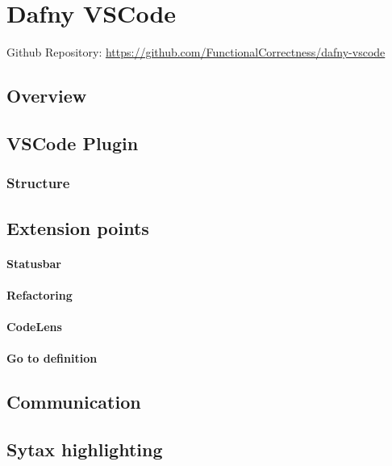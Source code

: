 \section{Dafny VSCode}
Github Repository: \href{https://github.com/FunctionalCorrectness/dafny-vscode}{https://github.com/FunctionalCorrectness/dafny-vscode}

\subsection{Overview}

\subsection{VSCode Plugin}
\subsubsection{Structure}




\subsection{Extension points}

\paragraph{Statusbar}

\paragraph{Refactoring}

\paragraph{CodeLens}

\paragraph{Go to definition}

\subsection{Communication}

\subsection{Sytax highlighting}

